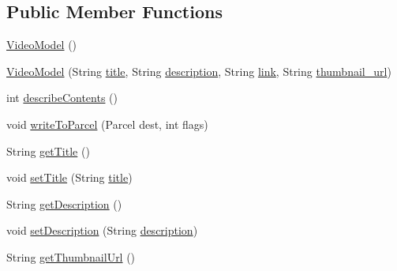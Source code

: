 \subsection*{Public Member Functions}
\begin{DoxyCompactItemize}
\item 
\hyperlink{classorg_1_1buildmlearn_1_1videocollection_1_1data_1_1VideoModel_a4efb22b0c91242d1f2e9e283d0cc309f}{Video\+Model} ()
\item 
\hyperlink{classorg_1_1buildmlearn_1_1videocollection_1_1data_1_1VideoModel_a8d2c45e9ea658563befc570f15ecb45f}{Video\+Model} (String \hyperlink{classorg_1_1buildmlearn_1_1videocollection_1_1data_1_1VideoModel_a9167ad2db7e5f86d94b0a627d74a10b7}{title}, String \hyperlink{classorg_1_1buildmlearn_1_1videocollection_1_1data_1_1VideoModel_a46c463c496e66a09acc123535f17fbec}{description}, String \hyperlink{classorg_1_1buildmlearn_1_1videocollection_1_1data_1_1VideoModel_acf994b6c064aa05c64e86bb6b74b6d64}{link}, String \hyperlink{classorg_1_1buildmlearn_1_1videocollection_1_1data_1_1VideoModel_ad793fdd9dc6317f284926a25a1906372}{thumbnail\+\_\+url})
\item 
int \hyperlink{classorg_1_1buildmlearn_1_1videocollection_1_1data_1_1VideoModel_a91c3aeef203c70a7814e6906c2c6a745}{describe\+Contents} ()
\item 
void \hyperlink{classorg_1_1buildmlearn_1_1videocollection_1_1data_1_1VideoModel_a12d6e6c545cc534011758090b03a1063}{write\+To\+Parcel} (Parcel dest, int flags)
\item 
String \hyperlink{classorg_1_1buildmlearn_1_1videocollection_1_1data_1_1VideoModel_ab4c2544f0ee7c30a398343e961943924}{get\+Title} ()
\item 
void \hyperlink{classorg_1_1buildmlearn_1_1videocollection_1_1data_1_1VideoModel_a747c76c5896769780f06fd848ffc20e0}{set\+Title} (String \hyperlink{classorg_1_1buildmlearn_1_1videocollection_1_1data_1_1VideoModel_a9167ad2db7e5f86d94b0a627d74a10b7}{title})
\item 
String \hyperlink{classorg_1_1buildmlearn_1_1videocollection_1_1data_1_1VideoModel_a47e21ace6be3f7b9a1254aeb9b6a746f}{get\+Description} ()
\item 
void \hyperlink{classorg_1_1buildmlearn_1_1videocollection_1_1data_1_1VideoModel_acfce037f1937ffd31f64bcacf48d8c45}{set\+Description} (String \hyperlink{classorg_1_1buildmlearn_1_1videocollection_1_1data_1_1VideoModel_a46c463c496e66a09acc123535f17fbec}{description})
\item 
String \hyperlink{classorg_1_1buildmlearn_1_1videocollection_1_1data_1_1VideoModel_a0dab109834db7aebcde1a6962abec731}{get\+Thumbnail\+Url} ()

\end{DoxyCompactItemize}

